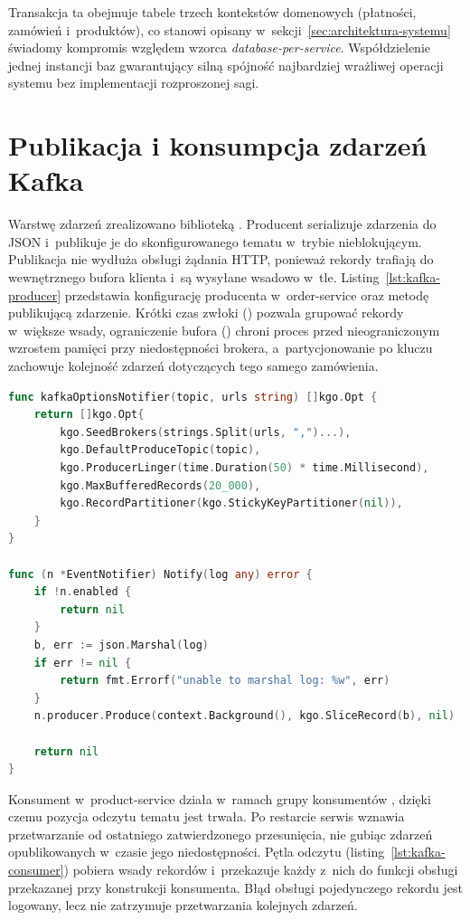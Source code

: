 Transakcja ta obejmuje tabele trzech kontekstów domenowych (płatności, zamówień i~produktów), co stanowi opisany
w~sekcji~\ref{sec:architektura-systemu} świadomy kompromis względem wzorca \emph{database-per-service}.
Współdzielenie jednej instancji baz gwarantujący silną spójność najbardziej wrażliwej operacji
systemu bez implementacji rozproszonej sagi.

\section{Publikacja i konsumpcja zdarzeń Kafka}
\label{sec:implementacja-kafka}

Warstwę zdarzeń zrealizowano biblioteką . Producent serializuje zdarzenia do JSON i~publikuje je
do skonfigurowanego tematu w~trybie nieblokującym. Publikacja nie wydłuża obsługi żądania HTTP, ponieważ rekordy
trafiają do wewnętrznego bufora klienta i~są wysyłane wsadowo w~tle. Listing~\ref{lst:kafka-producer} przedstawia
konfigurację producenta w~order-service oraz metodę publikującą zdarzenie. Krótki czas zwłoki
() pozwala grupować rekordy w~większe wsady, ograniczenie bufora
() chroni proces przed nieograniczonym wzrostem pamięci przy niedostępności brokera,
a~partycjonowanie po kluczu zachowuje kolejność zdarzeń dotyczących tego samego zamówienia.

\begin{lstlisting}[caption={Konfiguracja i nieblokująca publikacja zdarzeń w order-service},label={lst:kafka-producer},language=Go]
func kafkaOptionsNotifier(topic, urls string) []kgo.Opt {
    return []kgo.Opt{
        kgo.SeedBrokers(strings.Split(urls, ",")...),
        kgo.DefaultProduceTopic(topic),
        kgo.ProducerLinger(time.Duration(50) * time.Millisecond),
        kgo.MaxBufferedRecords(20_000),
        kgo.RecordPartitioner(kgo.StickyKeyPartitioner(nil)),
    }
}

func (n *EventNotifier) Notify(log any) error {
    if !n.enabled {
        return nil
    }
    b, err := json.Marshal(log)
    if err != nil {
        return fmt.Errorf("unable to marshal log: %w", err)
    }
    n.producer.Produce(context.Background(), kgo.SliceRecord(b), nil)

    return nil
}
\end{lstlisting}

Konsument w~product-service działa w~ramach grupy konsumentów , dzięki czemu pozycja odczytu
tematu  jest trwała. Po restarcie serwis wznawia przetwarzanie od ostatniego zatwierdzonego
przesunięcia, nie gubiąc zdarzeń opublikowanych w~czasie jego niedostępności. Pętla odczytu
(listing~\ref{lst:kafka-consumer}) pobiera wsady rekordów i~przekazuje każdy z~nich do funkcji obsługi
przekazanej przy konstrukcji konsumenta. Błąd obsługi pojedynczego rekordu jest logowany, lecz nie zatrzymuje
przetwarzania kolejnych zdarzeń.

